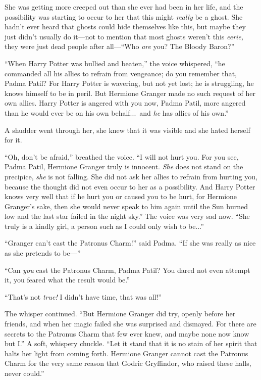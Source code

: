 She was getting more creeped out than she ever had been in her life, and the possibility was starting to occur to her that this might \emph{really} be a ghost. She hadn’t ever heard that ghosts could hide themselves like this, but maybe they just didn’t usually do it—not to mention that most ghosts weren’t this \emph{eerie,} they were just dead people after all—“Who \emph{are} you? The Bloody Baron?”

“When Harry Potter was bullied and beaten,” the voice whispered, “he commanded all his allies to refrain from vengeance; do you remember that, Padma Patil? For Harry Potter is wavering, but not yet lost; he is struggling, he knows himself to be in peril. But Hermione Granger made no such request of her own allies. Harry Potter is angered with you now, Padma Patil, more angered than he would ever be on his own behalf...\ and \emph{he} has allies of his own.”

A shudder went through her, she knew that it was visible and she hated herself for it.

“Oh, don’t be afraid,” breathed the voice. “I will not hurt you. For you see, Padma Patil, Hermione Granger truly is innocent. \emph{She} does not stand on the precipice, \emph{she} is not falling. She did not ask her allies to refrain from hurting you, because the thought did not even occur to her as a possibility. And Harry Potter knows very well that if he hurt you or caused you to be hurt, for Hermione Granger’s sake, then she would never speak to him again until the Sun burned low and the last star failed in the night sky.” The voice was very sad now. “She truly is a kindly girl, a person such as I could only wish to be...”

“Granger can’t cast the Patronus Charm!” said Padma. “If she was really as nice as she pretends to be—”

“Can \emph{you} cast the Patronus Charm, Padma Patil? You dared not even attempt it, you feared what the result would be.”

“That’s not \emph{true!} I didn’t have time, that was all!”

The whisper continued. “But Hermione Granger did try, openly before her friends, and when her magic failed she was surprised and dismayed. For there are secrets to the Patronus Charm that few ever knew, and maybe none now know but I.” A soft, whispery chuckle. “Let it stand that it is no stain of her spirit that halts her light from coming forth. Hermione Granger cannot cast the Patronus Charm for the very same reason that Godric Gryffindor, who raised these halls, never could.”

